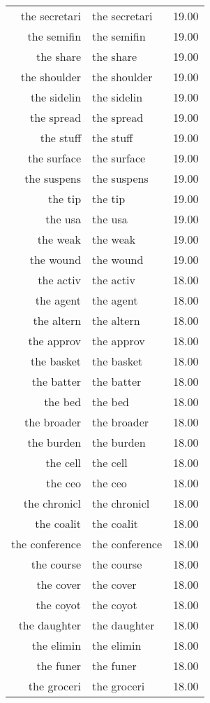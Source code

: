 \begin{table}[ht]
\begin{tabular}{rlr}
  the secretari & the secretari & 19.00 \\ 
  the semifin & the semifin & 19.00 \\ 
  the share & the share & 19.00 \\ 
  the shoulder & the shoulder & 19.00 \\ 
  the sidelin & the sidelin & 19.00 \\ 
  the spread & the spread & 19.00 \\ 
  the stuff & the stuff & 19.00 \\ 
  the surface & the surface & 19.00 \\ 
  the suspens & the suspens & 19.00 \\ 
  the tip & the tip & 19.00 \\ 
  the usa & the usa & 19.00 \\ 
  the weak & the weak & 19.00 \\ 
  the wound & the wound & 19.00 \\ 
  the activ & the activ & 18.00 \\ 
  the agent & the agent & 18.00 \\ 
  the altern & the altern & 18.00 \\ 
  the approv & the approv & 18.00 \\ 
  the basket & the basket & 18.00 \\ 
  the batter & the batter & 18.00 \\ 
  the bed & the bed & 18.00 \\ 
  the broader & the broader & 18.00 \\ 
  the burden & the burden & 18.00 \\ 
  the cell & the cell & 18.00 \\ 
  the ceo & the ceo & 18.00 \\ 
  the chronicl & the chronicl & 18.00 \\ 
  the coalit & the coalit & 18.00 \\ 
  the conference & the conference & 18.00 \\ 
  the course & the course & 18.00 \\ 
  the cover & the cover & 18.00 \\ 
  the coyot & the coyot & 18.00 \\ 
  the daughter & the daughter & 18.00 \\ 
  the elimin & the elimin & 18.00 \\ 
  the funer & the funer & 18.00 \\ 
  the groceri & the groceri & 18.00 \\ 

\end{tabular}
\end{table}
